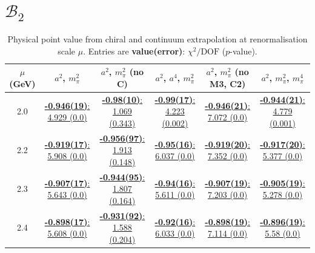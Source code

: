 \documentclass[12pt]{extarticle}
\begin{document}
\section{$\mathcal{B}_2$}
\begin{table}[h!]
\begin{center}
\begin{tabular}{|c|c|c|c|c|c|}
\hline
$\mu$ (GeV) & $a^2$, $m_\pi^2$& $a^2$, $m_\pi^2$ (no C)& $a^2$, $a^4$, $m_\pi^2$& $a^2$, $m_\pi^2$ (no M3, C2)& $a^2$, $m_\pi^2$, $m_\pi^4$\\
\hline
2.0& \hyperlink{VVmAA/SUSY/a2m2_20.pdf.1}{\textbf{-0.946(19)}: 4.929 (0.0)} & \hyperlink{VVmAA/SUSY/a2m2noC_20.pdf.1}{\textbf{-0.98(10)}: 1.069 (0.343)} & \hyperlink{VVmAA/SUSY/a2a4m2_20.pdf.1}{\textbf{-0.99(17)}: 4.223 (0.002)} & \hyperlink{VVmAA/SUSY/a2m2mcut_20.pdf.1}{\textbf{-0.946(21)}: 7.072 (0.0)} & \hyperlink{VVmAA/SUSY/a2m2m4_20.pdf.1}{\textbf{-0.944(21)}: 4.779 (0.001)}\\
2.2& \hyperlink{VVmAA/SUSY/a2m2_22.pdf.1}{\textbf{-0.919(17)}: 5.908 (0.0)} & \hyperlink{VVmAA/SUSY/a2m2noC_22.pdf.1}{\textbf{-0.956(97)}: 1.913 (0.148)} & \hyperlink{VVmAA/SUSY/a2a4m2_22.pdf.1}{\textbf{-0.95(16)}: 6.037 (0.0)} & \hyperlink{VVmAA/SUSY/a2m2mcut_22.pdf.1}{\textbf{-0.919(20)}: 7.352 (0.0)} & \hyperlink{VVmAA/SUSY/a2m2m4_22.pdf.1}{\textbf{-0.917(20)}: 5.377 (0.0)}\\
2.3& \hyperlink{VVmAA/SUSY/a2m2_23.pdf.1}{\textbf{-0.907(17)}: 5.643 (0.0)} & \hyperlink{VVmAA/SUSY/a2m2noC_23.pdf.1}{\textbf{-0.944(95)}: 1.807 (0.164)} & \hyperlink{VVmAA/SUSY/a2a4m2_23.pdf.1}{\textbf{-0.94(16)}: 5.611 (0.0)} & \hyperlink{VVmAA/SUSY/a2m2mcut_23.pdf.1}{\textbf{-0.907(19)}: 7.203 (0.0)} & \hyperlink{VVmAA/SUSY/a2m2m4_23.pdf.1}{\textbf{-0.905(19)}: 5.278 (0.0)}\\
2.4& \hyperlink{VVmAA/SUSY/a2m2_24.pdf.1}{\textbf{-0.898(17)}: 5.608 (0.0)} & \hyperlink{VVmAA/SUSY/a2m2noC_24.pdf.1}{\textbf{-0.931(92)}: 1.588 (0.204)} & \hyperlink{VVmAA/SUSY/a2a4m2_24.pdf.1}{\textbf{-0.92(16)}: 6.033 (0.0)} & \hyperlink{VVmAA/SUSY/a2m2mcut_24.pdf.1}{\textbf{-0.898(19)}: 7.114 (0.0)} & \hyperlink{VVmAA/SUSY/a2m2m4_24.pdf.1}{\textbf{-0.896(19)}: 5.58 (0.0)}\\
\hline
\end{tabular}
\caption{Physical point value from chiral and continuum extrapolation at renormalisation scale $\mu$. Entries are \textbf{value(error)}: $\chi^2/\text{DOF}$ ($p$-value).}
\end{center}
\end{table}
\end{document}
